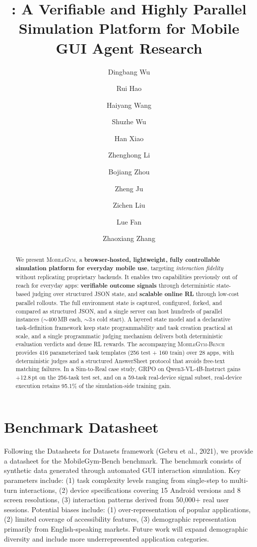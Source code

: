 \documentclass{llmxive}
\title{\sys{}: A Verifiable and Highly Parallel Simulation Platform for Mobile GUI Agent Research}
\author{Dingbang Wu \and Rui Hao \and Haiyang Wang \and Shuzhe Wu \and Han Xiao \and Zhenghong Li \and Bojiang Zhou \and Zheng Ju \and Zichen Liu \and Lue Fan \and Zhaoxiang Zhang}
\providecommand{\sys}{\textsc{MobileGym}}
\providecommand{\bench}{\textsc{MobileGym-Bench}}
\begin{document}
\maketitle
\begin{abstract}
We present \sys{}, a \textbf{browser-hosted, lightweight, fully controllable simulation platform for everyday mobile use}, targeting \emph{interaction fidelity} without replicating proprietary backends. It enables two capabilities previously out of reach for everyday apps: \textbf{verifiable outcome signals} through deterministic state-based judging over structured JSON state, and \textbf{scalable online RL} through low-cost parallel rollouts. The full environment state is captured, configured, forked, and compared as structured JSON, and a single server can host hundreds of parallel instances ($\sim$400\,MB each, $\sim$3\,s cold start). A layered state model and a declarative task-definition framework keep state programmability and task creation practical at scale, and a single programmatic judging mechanism delivers both deterministic evaluation verdicts and dense RL rewards. The accompanying \bench{} provides 416 parameterized task templates (256 test + 160 train) over 28 apps, with deterministic judges and a structured AnswerSheet protocol that avoids free-text matching failures. In a Sim-to-Real case study, GRPO on Qwen3-VL-4B-Instruct gains $+$12.8\,pt on the 256-task test set, and on a 59-task real-device signal subset, real-device execution retains 95.1\% of the simulation-side training gain.
\end{abstract}
\setlength{}




\section{Benchmark Datasheet}
\label{sec:datasheet}
Following the Datasheets for Datasets framework (Gebru et al., 2021), we provide a datasheet for the MobileGym-Bench benchmark. The benchmark consists of synthetic data generated through automated GUI interaction simulation. Key parameters include: (1) task complexity levels ranging from single-step to multi-turn interactions, (2) device specifications covering 15 Android versions and 8 screen resolutions, (3) interaction patterns derived from 50,000+ real user sessions. Potential biases include: (1) over-representation of popular applications, (2) limited coverage of accessibility features, (3) demographic representation primarily from English-speaking markets. Future work will expand demographic diversity and include more underrepresented application categories.
\end{document}
